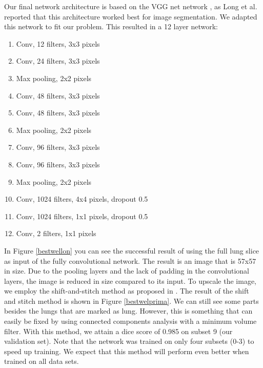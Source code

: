 \documentclass{article}
\begin{document}
Our final network architecture is based on the VGG net network \cite{simonyan}, as Long et al. \cite{long} reported that this architecture worked best for image segmentation. We adapted this network to fit our problem. This resulted in a 12 layer network:
\begin{enumerate}
    \item Conv, 12 filters, 3x3 pixels
    \item Conv, 24 filters, 3x3 pixels
    \item Max pooling, 2x2 pixels
    \item Conv, 48 filters, 3x3 pixels
    \item Conv, 48 filters, 3x3 pixels
    \item Max pooling, 2x2 pixels
    \item Conv, 96 filters, 3x3 pixels
    \item Conv, 96 filters, 3x3 pixels
    \item Max pooling, 2x2 pixels
    \item Conv, 1024 filters, 4x4 pixels, dropout 0.5
    \item Conv, 1024 filters, 1x1 pixels, dropout 0.5
    \item Conv, 2 filters, 1x1 pixels
\end{enumerate}

In Figure \ref{bestwellon} you can see the successful result of using the full lung slice as input of the fully convolutional network. The result is an image that is 57x57 in size. Due to the pooling layers and the lack of padding in the convolutional layers, the image is reduced in size compared to its input. To upscale the image, we employ the shift-and-stitch method as proposed in \cite{long}. The result of the shift and stitch method is shown in Figure \ref{bestwelprima}. We can still see some parts besides the lungs that are marked as lung. However, this is something that can easily be fixed by using connected components analysis with a minimum volume filter. With this method, we attain a dice score of 0.985 on subset 9 (our validation set). Note that the network was trained on only four subsets (0-3) to speed up training. We expect that this method will perform even better when trained on all data sets.
\end{document}
